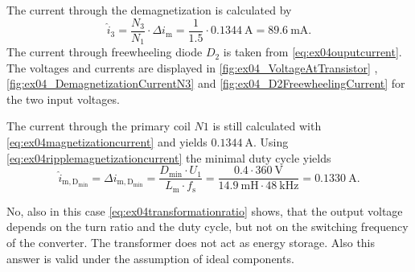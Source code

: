 \begin{solutionblock}
    The current through the demagnetization is calculated by
    \begin{equation}
        \hat{i}_\mathrm{3}=\frac{N_\mathrm{3}}{N_\mathrm{1}} \cdot \Delta i_\mathrm{m}
        =\frac{1}{1.5} \cdot \SI{0.1344}{\ampere}=\SI{89.6}{\milli\ampere}.
    \end{equation}
    The current through freewheeling diode $D_\mathrm{2}$ is taken from \eqref{eq:ex04ouputcurrent}.
    The voltages and currents are displayed in \autoref{fig:ex04_VoltageAtTransistor} , 
    \autoref{fig:ex04_DemagnetizationCurrentN3} and \autoref{fig:ex04_D2FreewheelingCurrent} for the two input voltages.
      

\end{solutionblock}
        
\begin{solutionblock}
    The current through the primary coil $N1$ is still calculated with \eqref{eq:ex04magnetizationcurrent} and yields
    $\SI{0.1344}{\ampere}$. 
    Using \eqref{eq:ex04ripplemagnetizationcurrent} the minimal duty cycle yields
    \begin{equation}
        \hat{i}_\mathrm{m,D_{min}}=\Delta i_\mathrm{m,D_{min}}= \frac{D_\mathrm{min} \cdot U_\mathrm{1}}{L_\mathrm{m} \cdot f_\mathrm{s}}
        =\frac{0.4 \cdot \SI{360}{\volt}}{\SI{14.9}{\milli\henry} \cdot \SI{48}{\kilo\hertz}}=\SI{0.1330}{\ampere}.
    \end{equation}
\end{solutionblock}


\begin{solutionblock}
    No,  also in this case \eqref{eq:ex04transformationratio} shows, that the output voltage depends on the turn ratio and the duty cycle,
    but not on the switching frequency of the converter. The transformer does not act as energy storage.
    Also this answer is valid under the assumption of ideal components. 
\end{solutionblock}